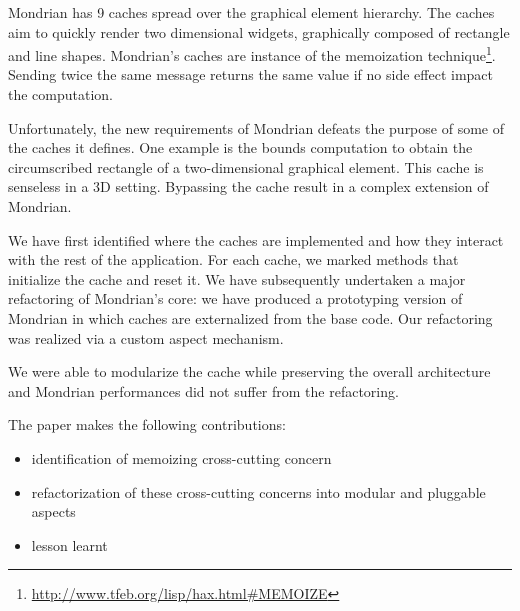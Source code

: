 \documentclass[preprint,10pt]{sigplanconf}
\begin{document}
Mondrian has 9 caches spread over the graphical element hierarchy. 
The caches aim to quickly render two dimensional widgets, graphically composed of rectangle and line shapes. Mondrian's caches are instance of the memoization technique\footnote{\url{http://www.tfeb.org/lisp/hax.html\#MEMOIZE}}. Sending twice the same message returns the same value if no side effect impact the computation. 

Unfortunately, the new requirements of Mondrian defeats the purpose of some of the caches it defines. One example is the bounds computation to obtain the circumscribed rectangle of a two-dimensional graphical element. This cache is senseless in a 3D setting. Bypassing the cache result in a complex extension of Mondrian.

We have first identified where the caches are implemented and how they interact with the rest of the application.
For each cache, we marked methods that initialize the cache and reset it. 
We have subsequently undertaken a major refactoring of Mondrian's core: we have produced a prototyping version of Mondrian in which caches are externalized from the base code. Our refactoring was realized via a custom aspect mechanism.

We were able to modularize the cache while preserving the overall architecture and Mondrian performances did not suffer from the refactoring.

The paper makes the following contributions:

\begin{itemize}
\item identification of memoizing cross-cutting concern 
\item refactorization of these cross-cutting concerns into modular and pluggable aspects
\item lesson learnt
\end{itemize}


\end{document}

